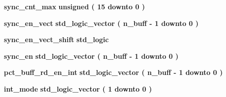 \begin{DoxyCompactItemize}
\item 
{\bf sync\+\_\+cnt\+\_\+max} {\bfseries \textcolor{comment}{unsigned}\textcolor{vhdlchar}{ }\textcolor{vhdlchar}{(}\textcolor{vhdlchar}{ }\textcolor{vhdlchar}{ } \textcolor{vhdldigit}{15} \textcolor{vhdlchar}{ }\textcolor{keywordflow}{downto}\textcolor{vhdlchar}{ }\textcolor{vhdlchar}{ } \textcolor{vhdldigit}{0} \textcolor{vhdlchar}{ }\textcolor{vhdlchar}{)}\textcolor{vhdlchar}{ }} 
\item 
{\bf sync\+\_\+en\+\_\+vect} {\bfseries \textcolor{comment}{std\+\_\+logic\+\_\+vector}\textcolor{vhdlchar}{ }\textcolor{vhdlchar}{(}\textcolor{vhdlchar}{ }\textcolor{vhdlchar}{ }\textcolor{vhdlchar}{ }\textcolor{vhdlchar}{ }{\bfseries {\bf n\+\_\+buff}} \textcolor{vhdlchar}{-\/}\textcolor{vhdlchar}{ } \textcolor{vhdldigit}{1} \textcolor{vhdlchar}{ }\textcolor{keywordflow}{downto}\textcolor{vhdlchar}{ }\textcolor{vhdlchar}{ } \textcolor{vhdldigit}{0} \textcolor{vhdlchar}{ }\textcolor{vhdlchar}{)}\textcolor{vhdlchar}{ }} 
\item 
{\bf sync\+\_\+en\+\_\+vect\+\_\+shift} {\bfseries \textcolor{comment}{std\+\_\+logic}\textcolor{vhdlchar}{ }} 
\item 
{\bf sync\+\_\+en} {\bfseries \textcolor{comment}{std\+\_\+logic\+\_\+vector}\textcolor{vhdlchar}{ }\textcolor{vhdlchar}{(}\textcolor{vhdlchar}{ }\textcolor{vhdlchar}{ }\textcolor{vhdlchar}{ }\textcolor{vhdlchar}{ }{\bfseries {\bf n\+\_\+buff}} \textcolor{vhdlchar}{-\/}\textcolor{vhdlchar}{ } \textcolor{vhdldigit}{1} \textcolor{vhdlchar}{ }\textcolor{keywordflow}{downto}\textcolor{vhdlchar}{ }\textcolor{vhdlchar}{ } \textcolor{vhdldigit}{0} \textcolor{vhdlchar}{ }\textcolor{vhdlchar}{)}\textcolor{vhdlchar}{ }} 
\item 
{\bf pct\+\_\+buff\+\_\+rd\+\_\+en\+\_\+int} {\bfseries \textcolor{comment}{std\+\_\+logic\+\_\+vector}\textcolor{vhdlchar}{ }\textcolor{vhdlchar}{(}\textcolor{vhdlchar}{ }\textcolor{vhdlchar}{ }\textcolor{vhdlchar}{ }\textcolor{vhdlchar}{ }{\bfseries {\bf n\+\_\+buff}} \textcolor{vhdlchar}{-\/}\textcolor{vhdlchar}{ } \textcolor{vhdldigit}{1} \textcolor{vhdlchar}{ }\textcolor{keywordflow}{downto}\textcolor{vhdlchar}{ }\textcolor{vhdlchar}{ } \textcolor{vhdldigit}{0} \textcolor{vhdlchar}{ }\textcolor{vhdlchar}{)}\textcolor{vhdlchar}{ }} 
\item 
{\bf int\+\_\+mode} {\bfseries \textcolor{comment}{std\+\_\+logic\+\_\+vector}\textcolor{vhdlchar}{ }\textcolor{vhdlchar}{(}\textcolor{vhdlchar}{ }\textcolor{vhdlchar}{ } \textcolor{vhdldigit}{1} \textcolor{vhdlchar}{ }\textcolor{keywordflow}{downto}\textcolor{vhdlchar}{ }\textcolor{vhdlchar}{ } \textcolor{vhdldigit}{0} \textcolor{vhdlchar}{ }\textcolor{vhdlchar}{)}\textcolor{vhdlchar}{ }} 
\end{DoxyCompactItemize}


